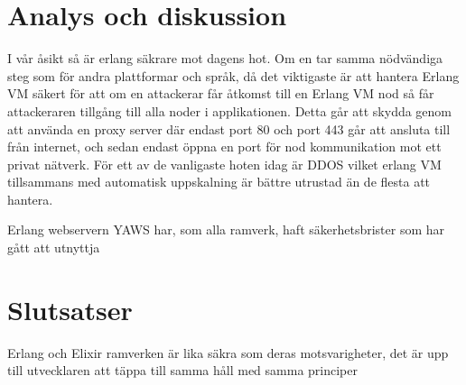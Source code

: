 \documentclass[12pt]{article}
\begin{document}
\section{	Analys och diskussion}


I vår åsikt så är erlang säkrare mot dagens hot.
 Om en tar samma nödvändiga steg som för andra plattformar och språk, då det viktigaste är att hantera Erlang VM säkert för att om en attackerar får åtkomst till en Erlang VM nod så får attackeraren tillgång till alla noder i applikationen.
 Detta går att skydda genom att använda en proxy \cite{101} server där endast port 80 och port 443 går att ansluta till från internet, och sedan endast öppna en port för nod kommunikation mot ett privat nätverk.
 För ett av de vanligaste hoten idag är DDOS vilket erlang VM tillsammans med automatisk uppskalning är bättre utrustad än de flesta att hantera.

Erlang webservern YAWS har, som alla ramverk, haft säkerhetsbrister som har gått att utnyttja \cite{exploit} 
	
\section{Slutsatser}


Erlang och Elixir ramverken är lika säkra som deras motsvarigheter, det är upp till utvecklaren att täppa till samma håll med samma principer
	
\end{document}
